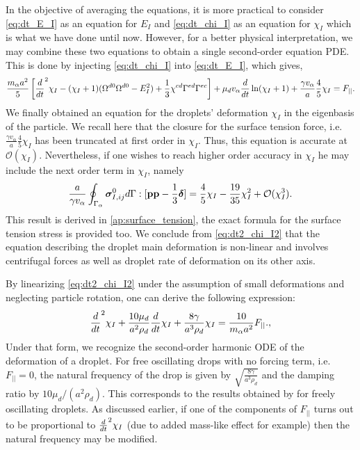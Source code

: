 In the objective of averaging the equations, it is more practical to consider \ref{eq:dt_E_I} as an equation for $E_I$ and \ref{eq:dt_chi_I} as an equation for $\chi_I$ which is what we have done until now. 
However, for a better physical interpretation, we may combine these two equations to obtain a single second-order equation PDE. 
This is done by injecting \ref{eq:dt_chi_I} into \ref{eq:dt_E_I}, which gives, 
\begin{equation}
    \frac{m_\alpha a^2}{5} \left[
        \ddt^2 \chi_I
        - (\chi_I+1)( \Omega^{d0} \Omega^{d0}  - E_I^2) 
        + \frac{1}{3} \chi^{cd}
        \Gamma^{ed}\Gamma^{ec}
    \right]
    +  \mu_d v_\alpha \ddt \ln(\chi_I+1)
    + \frac{\gamma v_\alpha }{a} 
    \frac{4  }{5} \chi_I
    = F_{||}. 
    \label{eq:dt2_chi_I2}
\end{equation} 
We finally obtained an equation for the droplets' deformation $\chi_I$ in the eigenbasis of the particle.
We recall here that the closure for the surface tension force, i.e. $\frac{\gamma v_\alpha }{a} \frac{4  }{5} \chi_I$ has been truncated at first order in $\chi_I$.
Thus, this equation is accurate at $\mathcal{O}(\chi_I)$.
Nevertheless, if one wishes to reach higher order accuracy in $\chi_I$ he may include the next order term in $\chi_I$, namely 
\begin{equation*}
    \frac{a}{\gamma v_\alpha}\oint_{\Gamma_{\alpha}} \bm\sigma_{I,ij}^0 d\Gamma : [\textbf{pp} - \frac{1}{3} \bm\delta]
    = \frac{4}{5} \chi_I - \frac{19}{35}\chi_I^2 + \mathcal{O}(\chi_I^3). 
\end{equation*}
This result is derived in \ref{ap:surface_tension}, the exact formula for the surface tension stress is provided too.  
We conclude from \ref{eq:dt2_chi_I2} that the equation describing the droplet main deformation is non-linear and involves centrifugal forces as well as droplet rate of deformation on its other axis. 


By linearizing \ref{eq:dt2_chi_I2} under the assumption of small deformations and neglecting particle rotation, one can derive the following expression:
\begin{equation}
    \ddt^2 \chi_I
    +\frac{10 \mu_d}{a^2\rho_d}   \ddt \chi_I
    + \frac{8 \gamma }{a^3\rho_d} 
     \chi_I
    = \frac{10}{m_\alpha a^2}F_{||}. ,
    \label{eq:lamb_like_model}
\end{equation} 
Under that form, we recognize the second-order harmonic ODE of the deformation of a droplet.
For free oscillating drops with no forcing term, i.e. $F_{||} = 0$, the natural frequency of the drop is given by $\sqrt{\frac{8 \gamma }{a^3\rho_d}}$ and the damping ratio by $10 \mu_d  /(a^2\rho_d)$. 
This corresponds to the results obtained by  \citet{lamb1924hydrodynamics} for freely oscillating droplets. 
As discussed earlier, if one of the components of $F_{||}$ turns out to be proportional to $\frac{d}{dt}^2 \chi_I$ (due to added mass-like effect for example) then the natural frequency may be modified. 

